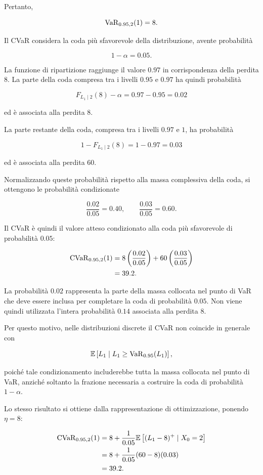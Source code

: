 Pertanto,

\[
\operatorname{VaR}_{0.95,2}(1)=8.
\]

Il CVaR considera la coda pi\`{u} sfavorevole della distribuzione,
avente probabilit\`{a}

\[
1-\alpha=0.05.
\]

La funzione di ripartizione raggiunge il valore $0.97$ in
corrispondenza della perdita $8$. La parte della coda compresa tra i
livelli $0.95$ e $0.97$ ha quindi probabilit\`{a}

\[
F_{L_1\mid 2}(8)-\alpha
=
0.97-0.95
=
0.02
\]

ed \`{e} associata alla perdita $8$.

La parte restante della coda, compresa tra i livelli $0.97$ e $1$, ha
probabilit\`{a}

\[
1-F_{L_1\mid 2}(8)
=
1-0.97
=
0.03
\]

ed \`{e} associata alla perdita $60$.

Normalizzando queste probabilit\`{a} rispetto alla massa complessiva
della coda, si ottengono le probabilit\`{a} condizionate

\[
\frac{0.02}{0.05}=0.40,
\qquad
\frac{0.03}{0.05}=0.60.
\]

Il CVaR \`{e} quindi il valore atteso condizionato alla coda
pi\`{u} sfavorevole di probabilit\`{a} $0.05$:

\[
\begin{split}
\operatorname{CVaR}_{0.95,2}(1)
&=
8\left(\frac{0.02}{0.05}\right)
+
60\left(\frac{0.03}{0.05}\right)
\\
&=
39.2.
\end{split}
\]

La probabilit\`{a} $0.02$ rappresenta la parte della massa collocata
nel punto di VaR che deve essere inclusa per completare la coda di
probabilit\`{a} $0.05$. Non viene quindi utilizzata l'intera
probabilit\`{a} $0.14$ associata alla perdita $8$.

Per questo motivo, nelle distribuzioni discrete il CVaR non coincide
in generale con

\[
\mathbb{E}
\left[
L_1
\mid
L_1\geq\operatorname{VaR}_{0.95}(L_1)
\right],
\]

poich\'{e} tale condizionamento includerebbe tutta la massa collocata
nel punto di VaR, anzich\'{e} soltanto la frazione necessaria a
costruire la coda di probabilit\`{a} $1-\alpha$.

Lo stesso risultato si ottiene dalla rappresentazione di
ottimizzazione, ponendo $\eta=8$:

\[
\begin{split}
\operatorname{CVaR}_{0.95,2}(1)
&=
8
+
\frac{1}{0.05}
\mathbb{E}\left[(L_1-8)^+\mid X_0=2\right]
\\
&=
8
+
\frac{1}{0.05}(60-8)(0.03)
\\
&=
39.2.
\end{split}
\]


